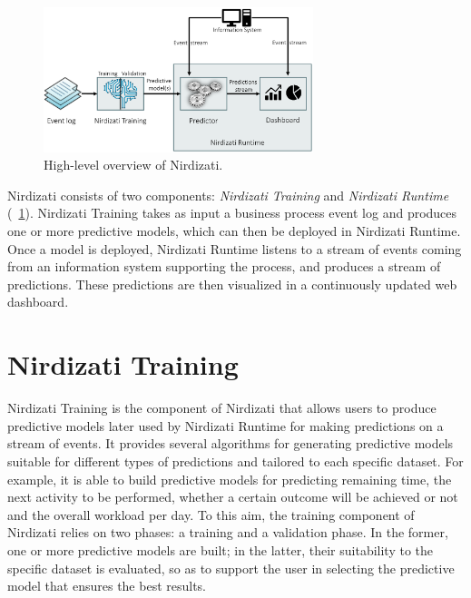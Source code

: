 \documentclass[runningheads,a4paper]{llncs}
\begin{document}
\begin{figure}[t]%
	\centering
	\includegraphics[width=0.7\textwidth]{img/nirdizati-overall}
	\caption{High-level overview of Nirdizati.}
	\label{fig:nirdizati-overall}
\end{figure}



Nirdizati consists of two components: \textit{Nirdizati Training} and \textit{Nirdizati Runtime} (\figurename~\ref{fig:nirdizati-overall}). Nirdizati Training takes as input a business process event log and produces one or more predictive models, which can then be deployed in Nirdizati Runtime. Once a model is deployed, Nirdizati Runtime listens to a stream of events coming from an information system supporting the process, and produces a stream of predictions. These predictions are then visualized in a continuously updated web dashboard.

\section{Nirdizati Training} \label{sec:training}
Nirdizati Training is the component of Nirdizati that allows users to produce predictive models later used by
Nirdizati Runtime for making predictions on a stream of events. It provides several algorithms for generating
predictive models suitable for different types of predictions and tailored to each specific dataset.
For example, it is able to build predictive models for predicting remaining time, the next activity to be
performed, whether a certain outcome will be achieved or not and the overall workload per day.
%
To this aim, the training component of Nirdizati relies on two phases: a training and a validation phase.
In the former, one or more predictive models are built; in the latter, their suitability to the specific
dataset is evaluated, so as to support the user in selecting the predictive model that ensures the best results.
\end{document}

